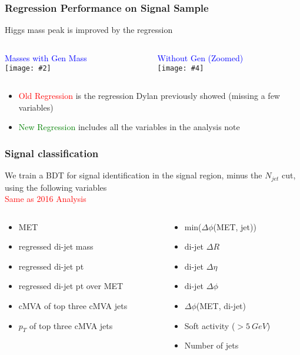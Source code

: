 \documentclass{beamer}
\newcommand{\twofigs}[4]{
  \begin{columns}
    \begin{column}{0.5\linewidth}
      \centering
      \textcolor{blue}{#1} \\
      \texttt{[image: \#2]}
    \end{column}
    \begin{column}{0.5\linewidth}
      \centering
      \textcolor{blue}{#3} \\
      \texttt{[image: \#4]}
    \end{column}
  \end{columns}
}
\begin{document}
\begin{frame}
  \frametitle{Regression Performance on Signal Sample}

  Higgs mass peak is improved by the regression

  \twofigs{Masses with Gen Mass}
          {180209_v1/regression_withgen.pdf}
          {Without Gen (Zoomed)}
          {180209_v1/regression.pdf}

  \begin{itemize}
  \item \textcolor{red}{Old Regression} is the regression Dylan previously showed
    (missing a few variables)
  \item \textcolor{green}{New Regression} includes all the variables in the analysis note
  \end{itemize}

\end{frame}

\begin{frame}
  \frametitle{Signal classification}
  We train a BDT for signal identification in the signal region, minus the $N_{jet}$ cut,
  using the following variables \\
  \textcolor{red}{Same as 2016 Analysis}

  \begin{columns}
    \begin{column}{0.5\linewidth}
      \begin{itemize}
      \item MET
      \item regressed di-jet mass
      \item regressed di-jet pt
      \item regressed di-jet pt over MET
      \item cMVA of top three cMVA jets
      \item $p_T$ of top three cMVA jets
      \end{itemize}
    \end{column}
    \begin{column}{0.5\linewidth}
      \begin{itemize}
      \item min($\Delta \phi$(MET, jet))
      \item di-jet $\Delta R$
      \item di-jet $\Delta \eta$
      \item di-jet $\Delta \phi$
      \item $\Delta \phi$(MET, di-jet)
      \item Soft activity ($> \SI{5}{GeV}$)
      \item Number of jets
      \end{itemize}
    \end{column}
  \end{columns}
\end{frame}
\end{document}

